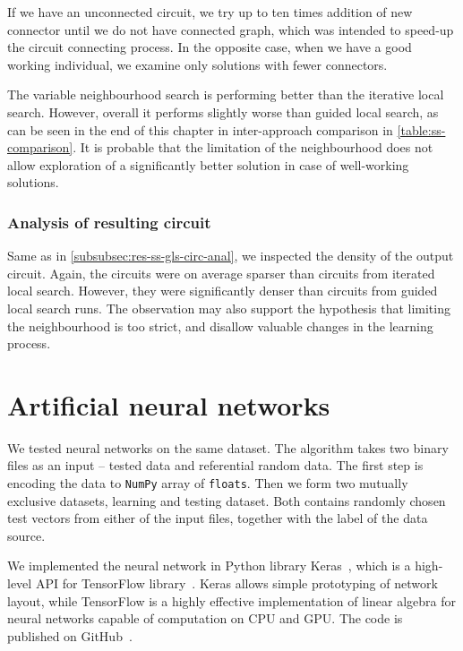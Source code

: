\documentclass[
  print, %
  Table,   %
  nolof,     %
  nolot,     %
  11pt, %
  oneside  %
]{fithesis3}
\begin{document}
If we have an unconnected circuit, we try up to ten times addition of new connector until we do not have connected graph, which was intended to speed-up the circuit connecting process. In the opposite case, when we have a good working individual, we examine only solutions with fewer connectors.

The variable neighbourhood search is performing better than the iterative local search. However, overall it performs slightly worse than guided local search, as can be seen in the end of this chapter in inter-approach comparison in \cref{table:ss-comparison}. It is probable that the limitation of the neighbourhood does not allow exploration of a significantly better solution in case of well-working solutions.

\subsubsection{\textbf{Analysis of resulting circuit}}
\label{subsubsec:res-ss-vns-circ-anal}

Same as in \cref{subsubsec:res-ss-gls-circ-anal}, we inspected the density of the output circuit. Again, the circuits were on average sparser than circuits from iterated local search. However, they were significantly denser than circuits from guided local search runs. The observation may also support the hypothesis that limiting the neighbourhood is too strict, and disallow valuable changes in the learning process.


\section{Artificial neural networks}
\label{sec:res-ann}

We tested neural networks on the same dataset. The algorithm takes two binary files as an input -- tested data and referential random data. The first step is encoding the data to \texttt{NumPy} array of \texttt{floats}. Then we form two mutually exclusive datasets, learning and testing dataset. Both contains randomly chosen test vectors from either of the input files, together with the label of the data source.

We implemented the neural network in Python library Keras~\cite{chollet2015keras}, which is a high-level API for TensorFlow library~\cite{abadi2016tensorflow}. Keras allows simple prototyping of network layout, while TensorFlow is a highly effective implementation of linear algebra for neural networks capable of computation on CPU and GPU. The code is published on GitHub~\cite{EANet}.
\end{document}
